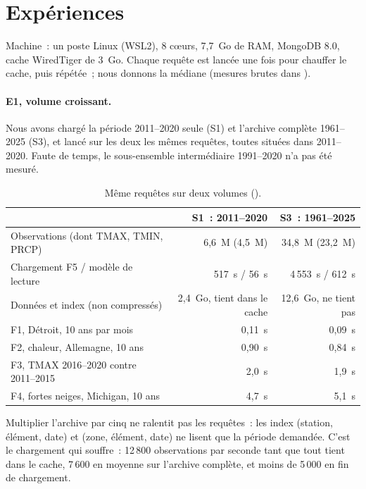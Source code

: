 \section{Expériences}
\label{sec:experiences}

Machine~: un poste Linux (WSL2), 8 cœurs, 7,7~Go de RAM, MongoDB 8.0, cache WiredTiger de 3~Go. Chaque requête est lancée une fois pour chauffer le cache, puis répétée~; nous donnons la médiane (mesures brutes dans ).

\paragraph{E1, volume croissant.} Nous avons chargé la période 2011--2020 seule (S1) et l'archive complète 1961--2025 (S3), et lancé sur les deux les mêmes requêtes, toutes situées dans 2011--2020. Faute de temps, le sous-ensemble intermédiaire 1991--2020 n'a pas été mesuré.

\begin{table}[h!]
  \centering\small
  \begin{tabular}{lrr}
    \toprule
     & S1~: 2011--2020 & S3~: 1961--2025 \\
    \midrule
    Observations (dont TMAX, TMIN, PRCP) & 6,6~M (4,5~M) & 34,8~M (23,2~M) \\
    Chargement F5 / modèle de lecture & 517~s / 56~s & 4\,553~s / 612~s \\
    Données et index (non compressés) & 2,4~Go, tient dans le cache & 12,6~Go, ne tient pas \\
    F1, Détroit, 10 ans par mois & 0,11~s & 0,09~s \\
    F2, chaleur, Allemagne, 10 ans & 0,90~s & 0,84~s \\
    F3, TMAX 2016--2020 contre 2011--2015 & 2,0~s & 1,9~s \\
    F4, fortes neiges, Michigan, 10 ans & 4,7~s & 5,1~s \\
    \bottomrule
  \end{tabular}
  \caption{Même requêtes sur deux volumes ().}
\end{table}

Multiplier l'archive par cinq ne ralentit pas les requêtes~: les index (station, élément, date) et (zone, élément, date) ne lisent que la période demandée. C'est le chargement qui souffre~: 12\,800 observations par seconde tant que tout tient dans le cache, 7\,600 en moyenne sur l'archive complète, et moins de 5\,000 en fin de chargement.

